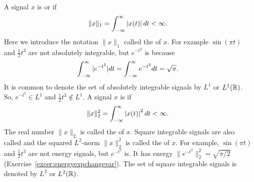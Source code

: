 A signal $x$ is  or  if
\begin{equation}\label{eq:l1normdefncontinuous}
\|x\|_1 = \int_{-\infty}^{\infty} \left\vert x(t) \right\vert dt < \infty.
\end{equation}
Here we introduce the notation $\|x\|_1$ called the  of $x$.  For example $\sin( \pi t)$ and $\tfrac{1}{2}t^3$ are not absolutely integrable, but $e^{-t^2}$ is because~\citep{nicholas_1950_erf}
\begin{equation}\label{eq:expabssum}
\int_{-\infty}^{\infty} \vert e^{-t^2} \vert dt = \int_{-\infty}^{\infty} e^{-t^2} dt  = \sqrt{\pi}.
\end{equation}
It is common to denote the set of absolutely integrable signals by $L^1$ or $L^1({\mathbb R})$.  So, $e^{-t^2} \in L^1$ and $\tfrac{1}{2}t^3 \notin L^1$.   A signal $x$ is  if
\[
\|x\|_2^2 = \int_{-\infty}^{\infty} \left\vert x(t) \right\vert^2 dt < \infty.
\]
The real number $\|x\|_2$ is called the  of $x$.  Square integrable signals are also called  and the squared $L^2$-norm $\|x\|_2^2$ is called the  of $x$. For example, $\sin( \pi t)$ and $\tfrac{1}{2}t^3$ are not energy signals, but $e^{-t^2}$ is.  It has energy $\|e^{-t^2}\|_2^2 = \sqrt{\pi/2}$ (Exercise~\ref{excer:energyexpchangevar}). The set of square integrable signals is denoted by $L^2$ or $L^2({\mathbb R})$.  %

